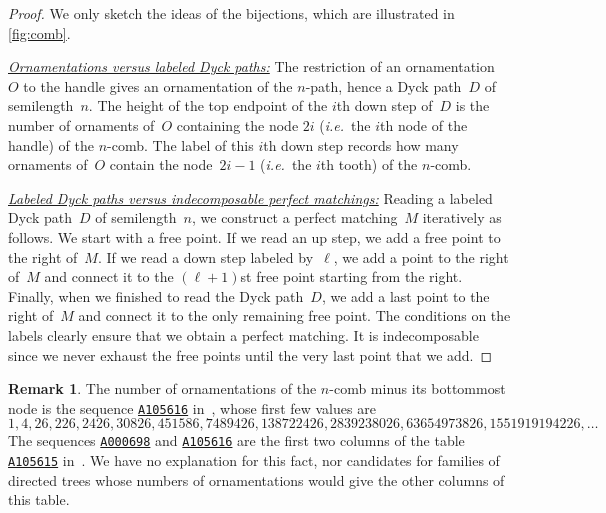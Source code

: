 \documentclass{amsart}
\theoremstyle{definition}
\newtheorem{remark}[theorem]{Remark}
\newcommand{\ie}{\textit{i.e.}~} %
\newcommand{\OEIS}[1]{{\rm \href{http://oeis.org/#1}{\texttt{#1}}}}
\begin{document}
\begin{proof}
We only sketch the ideas of the bijections, which are illustrated in \cref{fig:comb}.

\medskip\noindent
\uline{\textsl{Ornamentations versus labeled Dyck paths:}}
The restriction of an ornamentation~$O$ to the handle gives an ornamentation of the $n$-path, hence a Dyck path~$D$ of semilength~$n$.
The height of the top endpoint of the $i$th down step of~$D$ is the number of ornaments of~$O$ containing the node $2i$ (\ie the $i$th node of the handle) of the $n$-comb.
The label of this $i$th down step records how many ornaments of~$O$ contain the node~$2i-1$ (\ie the $i$th tooth) of the $n$-comb.

\medskip\noindent
\uline{\textsl{Labeled Dyck paths versus indecomposable perfect matchings:}}
Reading a labeled Dyck path~$D$ of semilength~$n$, we construct a perfect matching~$M$ iteratively as follows.
We start with a free point.
If we read an up step, we add a free point to the right of~$M$.
If we read a down step labeled by~$\ell$, we add a point to the right of~$M$ and connect it to the $(\ell+1)$st free point starting from the right.
Finally, when we finished to read the Dyck path~$D$, we add a last point to the right of~$M$ and connect it to the only remaining free point.
The conditions on the labels clearly ensure that we obtain a perfect matching.
It is indecomposable since we never exhaust the free points until the very last point that we add.
\end{proof}

\begin{remark}
The number of ornamentations of the $n$-comb minus its bottommost node is the sequence \OEIS{A105616} in~\cite{OEIS}, whose first few values are
\[
1, 4, 26, 226, 2426, 30826, 451586, 7489426, 138722426, 2839238026, 63654973826, 1551919194226, \dots %
\]
The sequences \OEIS{A000698} and \OEIS{A105616} are the first two columns of the table \OEIS{A105615} in~\cite{OEIS}.
We have no explanation for this fact, nor candidates for families of directed trees whose numbers of ornamentations would give the other columns of this table.
\end{remark}
\end{document}
